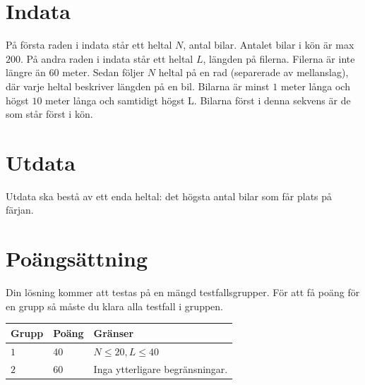 \section*{Indata}
På första raden i indata står ett heltal $N$, antal bilar. Antalet bilar i kön är max $200$. På andra raden i indata står ett heltal $L$, längden på filerna. Filerna är inte längre än $60$ meter. Sedan följer $N$ heltal på en rad (separerade av mellanslag), där varje heltal beskriver längden på en bil. Bilarna är minst $1$ meter långa och högst $10$ meter långa och samtidigt högst L. Bilarna först i denna sekvens är de som står först i kön.

\section*{Utdata}
Utdata ska bestå av ett enda heltal: det högsta antal bilar som får plats på färjan.

\section*{Poängsättning}
Din lösning kommer att testas på en mängd testfallsgrupper.
För att få poäng för en grupp så måste du klara alla testfall i gruppen.

\noindent
\begin{tabular}{| l | l | p{12cm} |}
  \hline
  \textbf{Grupp} & \textbf{Poäng} & \textbf{Gränser} \\ \hline
  $1$    & $40$        & $N \le 20, L \le 40$ \\ \hline 
  $2$    & $60$        & Inga ytterligare begränsningar. \\ \hline 
\end{tabular}
